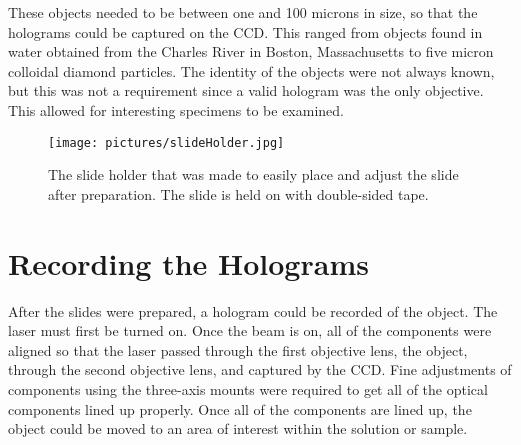 These objects
needed to be between one and 100 microns in size, so that the holograms could
be captured on the CCD\@. This ranged from objects found in water obtained from the
Charles River in Boston, Massachusetts to five micron colloidal diamond
particles. The identity of the objects were not always known, but this was not
a requirement since a valid hologram was the only objective. This allowed for
interesting specimens to be examined.


\begin{figure}[htbp!]
\begin{center}
    \texttt{[image: pictures/slideHolder.jpg]}
\end{center}
\caption{The slide holder that was made to easily place and adjust the slide
after preparation. The slide is held on with double-sided tape.}
\label{fig:slideHolder}
\end{figure}


\section{Recording the Holograms}

After the slides were prepared, a hologram could be recorded of the object. The
laser must first be turned on. Once the beam is on, all of the components were
aligned so that the laser passed through the first objective lens, the object,
through the second objective lens, and captured by the CCD\@. Fine
adjustments of components using the three-axis mounts were required to get all of the optical
components lined up properly.
Once all of the
components are lined up, the object could be moved to an area of
interest within the solution or sample. 
%

